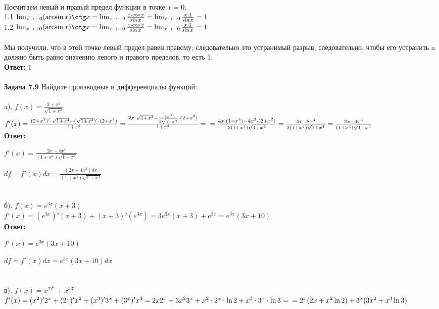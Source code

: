 \documentclass[a4paper, 12pt]{article}
\begin{document}
    \\ Посчитаем левый и правый предел функции в точке $x = 0$:
    \\ 1.1 $\lim_{x \to -0} (\arcsin x) \ctg x = \lim_{x \to -0} \frac{x \cdot \cos x}{\sin x} = \lim_{x \to -0} \frac{x \cdot 1}{\sin x} = 1$
    \\ 1.2 $\lim_{x \to +0} (\arcsin x) \ctg x = \lim_{x \to +0} \frac{x \cdot \cos x}{\sin x} = \lim_{x \to +0} \frac{x \cdot 1}{\sin x} = 1$
    \\
    \\ Мы получили, что в этой точке левый предел равен правому, следовательно это устранимый разрыв, следовательно, чтобы его устранить $a$ должно быть равно значению левого и правого пределов, то есть 1.
    \\ \textbf{Ответ: }1
    \\
    \\ \textbf{Задача 7.9} Найдите производные и дифференциалы функций:
    \\
    \\ a). $f(x) = \frac{2 + x^2}{\sqrt{1 + x^4}}$
    \\ $f'(x) = \frac{(2 + x^2)' \cdot \sqrt{1 + x^4} - (\sqrt{1 + x^4})' \cdot (2 + x^2)}{1 + x^4} = \frac{2x \cdot \sqrt{1 + x^4} - \frac{4x^3}{2\sqrt{1 + x^4}} \cdot (2 + x^2)}{1 + x^4} = 
    \\ = \frac{4x \cdot (1 + x^4) - 4x^3 \cdot (2 + x^2)}{2(1 + x^4)\sqrt{1 + x^4}} = \frac{4x - 8x^3}{2(1 + x^4)\sqrt{1 + x^4}} = \frac{2x - 4x^3}{(1 + x^4)\sqrt{1 + x^4}}$
    \\ \textbf{Ответ: }
    \par $f'(x) = \frac{2x - 4x^3}{(1 + x^4)\sqrt{1 + x^4}}$
    \par $df = f'(x)dx = \frac{(2x - 4x^3) dx}{(1 + x^4)\sqrt{1 + x^4}}$
    \\
    \\
    \\ б). $f(x) = e^{3x}(x + 3)$
    \\ $f'(x) = (e^{3x})'(x + 3) + (x + 3)'(e^{3x}) = 3e^{3x}(x + 3) + e^{3x} = e^{3x}(3x + 10)$
    \\ \textbf{Ответ: }
    \par $f'(x) = e^{3x}(3x + 10)$
    \par $df = f'(x)dx = e^{3x}(3x + 10)dx$
    \\
    \\
    \\ в). $f(x) = x^22^x + x^33^x$
    \\ $f'(x) = (x^2)'2^x + (2^x)'x^2 + (x^3)'3^x + (3^x)'x^3 = 2x2^x + 3x^23^x + x^2 \cdot 2^x \cdot \ln 2 + x^3 \cdot 3^x \cdot \ln 3 = \\ = 2^x(2x + x^2\ln 2) + 3^x(3x^2 + x^3 \ln 3)$
\end{document}
